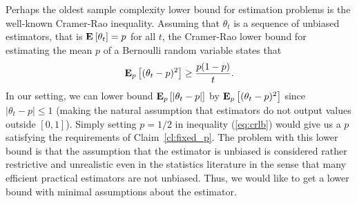 Perhaps the oldest sample complexity lower bound for estimation problems
is the well-known Cramer-Rao inequality.
Assuming that $\theta_t$ is a sequence of unbiased estimators,
that is $\Exp{\theta_t} = p$ for all $t$, the Cramer-Rao lower bound
for estimating the mean $p$ of a Bernoulli random variable states
that
\begin{equation}\label{eq:crlb}
  \bm{\mathrm{E}}_{p} \left[ (\theta_t - p)^2 \right] \geq \frac{p(1-p)}{t}.
\end{equation}
In our setting, we can lower bound $\bm{\mathrm{E}}_{p} \left[ |\theta_t - p| \right]$ by
$\bm{\mathrm{E}}_{p} \left[ (\theta_t - p)^2 \right]$ since $|\theta_t - p| \leq 1$
(making the natural assumption that estimators do not output values outside
$[0,1]$).
Simply setting $p=1/2$ in inequality (\ref{eq:crlb}) would give us a
$p$ satisfying the requirements of Claim~\ref{cl:fixed_p}.
The problem with this lower bound is that the assumption that the estimator
is unbiased is considered rather restrictive and unrealistic even in
the statistics literature in the sense that many efficient practical
estimators are not unbiased.  Thus, we would like to get a lower bound
with minimal assumptions about the estimator.

